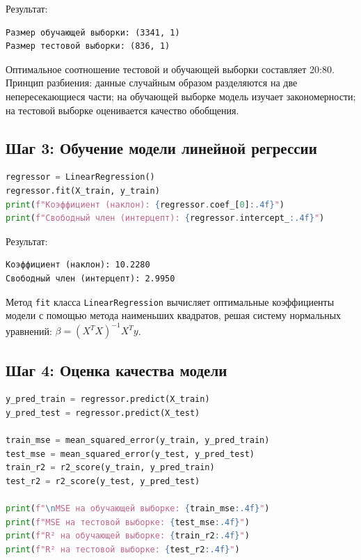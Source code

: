 Результат:

\begin{verbatim}
Размер обучающей выборки: (3341, 1)
Размер тестовой выборки: (836, 1)
\end{verbatim}

Оптимальное соотношение тестовой и обучающей выборки составляет 20:80. Принцип разбиения: данные случайным образом разделяются на две непересекающиеся части; на обучающей выборке модель изучает закономерности; на тестовой выборке оценивается качество обобщения.

\subsection{Шаг 3: Обучение модели линейной регрессии}

\begin{lstlisting}[language=Python, caption=Обучение модели]
regressor = LinearRegression()
regressor.fit(X_train, y_train)
print(f"Коэффициент (наклон): {regressor.coef_[0]:.4f}")
print(f"Свободный член (интерцепт): {regressor.intercept_:.4f}")
\end{lstlisting}

Результат:

\begin{verbatim}
Коэффициент (наклон): 10.2280
Свободный член (интерцепт): 2.9950
\end{verbatim}

Метод \texttt{fit} класса \texttt{LinearRegression} вычисляет оптимальные коэффициенты модели с помощью метода наименьших квадратов, решая систему нормальных уравнений: $\beta = (X^T X)^{-1} X^T y$.

\subsection{Шаг 4: Оценка качества модели}

\begin{lstlisting}[language=Python, caption=Оценка качества]
y_pred_train = regressor.predict(X_train)
y_pred_test = regressor.predict(X_test)

train_mse = mean_squared_error(y_train, y_pred_train)
test_mse = mean_squared_error(y_test, y_pred_test)
train_r2 = r2_score(y_train, y_pred_train)
test_r2 = r2_score(y_test, y_pred_test)

print(f"\nMSE на обучающей выборке: {train_mse:.4f}")
print(f"MSE на тестовой выборке: {test_mse:.4f}")
print(f"R² на обучающей выборке: {train_r2:.4f}")
print(f"R² на тестовой выборке: {test_r2:.4f}")
\end{lstlisting}

